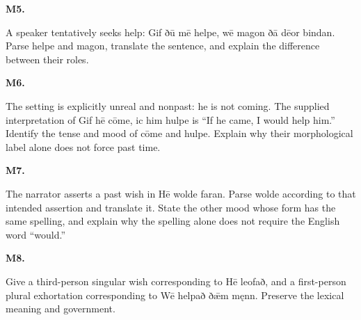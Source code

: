 \par\begin{minipage}{\linewidth}\raggedright
\textbf{M5.}

A speaker tentatively seeks help: Gif ðū mē helpe, wē magon ðā dēor bindan. Parse helpe and magon, translate the sentence, and explain the difference between their roles.

\end{minipage}\par\addvspace{4pt}

\par\begin{minipage}{\linewidth}\raggedright
\textbf{M6.}

The setting is explicitly unreal and nonpast: he is not coming. The supplied interpretation of Gif hē cōme, ic him hulpe is “If he came, I would help him.” Identify the tense and mood of cōme and hulpe. Explain why their morphological label alone does not force past time.

\end{minipage}\par\addvspace{4pt}

\par\begin{minipage}{\linewidth}\raggedright
\textbf{M7.}

The narrator asserts a past wish in Hē wolde faran. Parse wolde according to that intended assertion and translate it. State the other mood whose form has the same spelling, and explain why the spelling alone does not require the English word “would.”

\end{minipage}\par\addvspace{4pt}

\par\begin{minipage}{\linewidth}\raggedright
\textbf{M8.}

Give a third-person singular wish corresponding to Hē leofað, and a first-person plural exhortation corresponding to Wē helpað ðǣm męnn. Preserve the lexical meaning and government.

\end{minipage}\par\addvspace{4pt}

